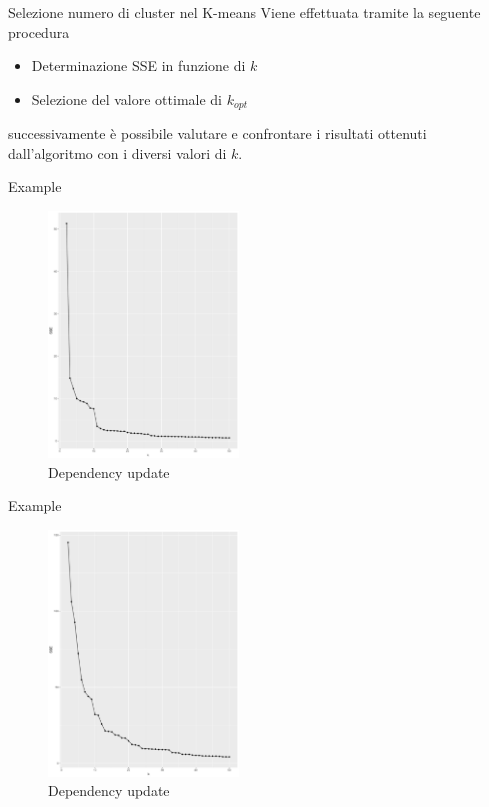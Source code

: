 \documentclass{beamer}
\begin{document}
\begin{frame}{Selezione numero di cluster nel K-means} 
    Viene effettuata tramite la seguente procedura
    \begin{itemize}
      \item Determinazione SSE in funzione di $k$
      \item Selezione del valore ottimale di $k_{opt}$ 
    \end{itemize} 
    successivamente è possibile valutare e confrontare i risultati ottenuti dall'algoritmo
    con i diversi valori di $k$.
\end{frame}

\begin{frame}{Example}
    \begin{figure}[bt]
      \begin{center}
      \includegraphics[width = 0.45\textwidth]{../img/k-sse-crediti-totali-arc-prg.pdf}
      \caption{Dependency update}
      \end{center}
    \end{figure}
\end{frame}

\begin{frame}{Example}
  \begin{figure}[bt]
    \begin{center}
    \includegraphics[width = 0.45\textwidth]{../img/k-sse-asd-arc-prg-an1-mdl.pdf}
    \caption{Dependency update}
    \end{center}
  \end{figure}
\end{frame}
\end{document}
